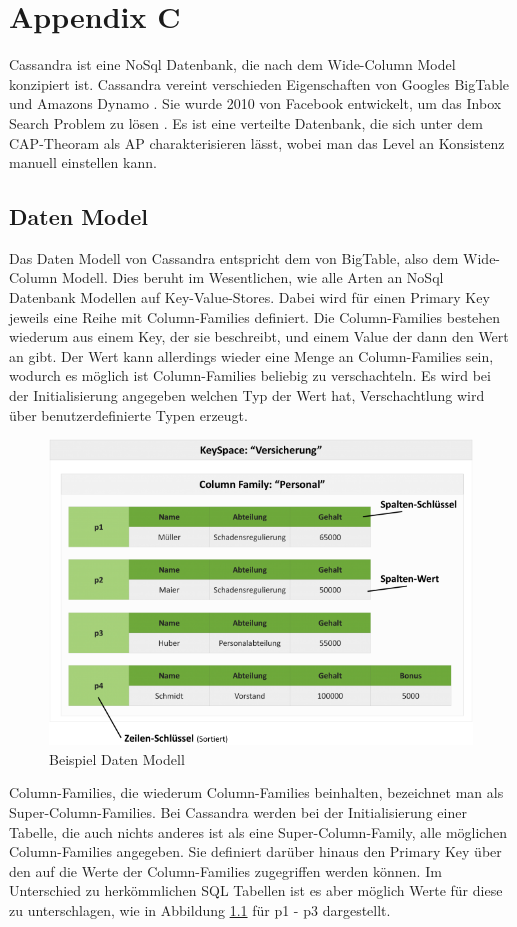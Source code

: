 \chapter{Appendix C}
\label{appendix:Cassandra}
Cassandra ist eine NoSql Datenbank, die nach dem Wide-Column Model konzipiert ist. Cassandra vereint verschieden Eigenschaften von Googles BigTable \cite{bigtable} und Amazons Dynamo \cite{dynamo}. Sie wurde 2010 von Facebook entwickelt, um das Inbox Search Problem zu lösen \cite{cassandra}. Es ist eine verteilte Datenbank, die sich unter dem CAP-Theoram als AP charakterisieren lässt, wobei man das Level an Konsistenz manuell einstellen kann.

\section{Daten Model}
\label{sec:DM}
Das Daten Modell von Cassandra entspricht dem von BigTable, also dem Wide-Column Modell. Dies beruht im Wesentlichen, wie alle Arten an NoSql Datenbank Modellen auf Key-Value-Stores. Dabei wird für einen Primary Key jeweils eine Reihe mit Column-Families definiert. Die Column-Families bestehen wiederum aus einem Key, der sie beschreibt, und einem Value der dann den Wert an gibt. Der Wert kann allerdings wieder eine Menge an Column-Families sein, wodurch es möglich ist Column-Families beliebig zu verschachteln. Es wird bei der Initialisierung angegeben welchen Typ der Wert hat, Verschachtlung wird über benutzerdefinierte Typen erzeugt.
\begin{figure}[htbp!]
	\centering
	\includegraphics[scale=0.45]{pics/colfam.png}
	\caption{Beispiel Daten Modell}
	\label{fig:bspDM}
\end{figure} Column-Families, die wiederum Column-Families beinhalten, bezeichnet man als Super-Column-Families. Bei Cassandra werden bei der Initialisierung einer Tabelle, die auch nichts anderes ist als eine Super-Column-Family, alle möglichen Column-Families angegeben. Sie definiert darüber hinaus den Primary Key über den auf die Werte der Column-Families zugegriffen werden können. Im Unterschied zu herkömmlichen SQL Tabellen ist es aber möglich Werte für diese zu unterschlagen, wie in Abbildung \ref{fig:bspDM} für p1 - p3 dargestellt.\\ 
